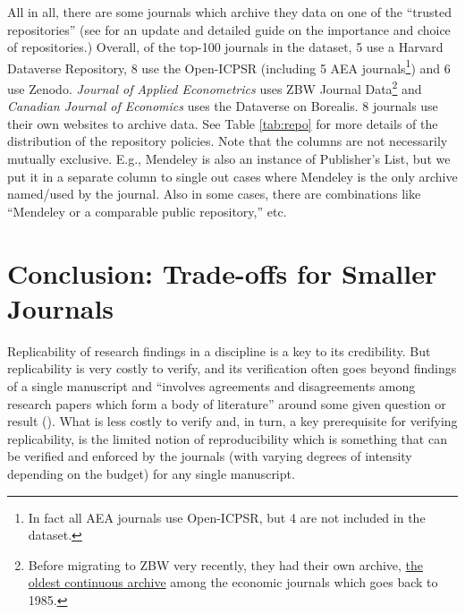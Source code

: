 \documentclass[11pt]{article}
\begin{document}
All in all, there are some journals which archive they data on one of the ``trusted repositories'' (see \cite{connolly2023journal} for an update and detailed guide on the importance and choice of repositories.) Overall, of the top-100 journals in the dataset, 5 use a Harvard Dataverse Repository, 8 use the Open-ICPSR (including 5 AEA journals\footnote{In fact all AEA journals use Open-ICPSR, but 4 are not included in the dataset.}) and 6 use Zenodo. \textit{Journal of Applied Econometrics} uses ZBW Journal Data\footnote{Before migrating to ZBW very recently, they had their own archive, \href{http://qed.econ.queensu.ca/jae/}{the oldest continuous archive} among the economic journals which goes back to 1985.} and \textit{Canadian Journal of Economics} uses the Dataverse on Borealis. 8 journals use their own websites to archive data. See Table \ref{tab:repo} for more details of the distribution of the repository policies. Note that the columns are not necessarily mutually exclusive. E.g., Mendeley is also an instance of Publisher's List, but we put it in a separate column to single out cases where Mendeley is the only archive named/used by the journal. Also in some cases, there are combinations like ``Mendeley or a comparable public repository,'' etc.\\





\newpage
\section{Conclusion: Trade-offs for Smaller Journals}
\label{conc}
Replicability of research findings in a discipline is a key to its credibility. But replicability is very costly to verify, and its verification often goes beyond findings of a single manuscript and ``involves agreements and disagreements among research papers which form a body of literature'' around some given question or result (\cite{vilhuber2023reproducibility}). What is less costly to verify and, in turn, a key prerequisite for verifying replicability, is the limited notion of reproducibility which is something that can be verified and enforced by the journals (with varying degrees of intensity depending on the budget) for any single manuscript. \\
\end{document}
